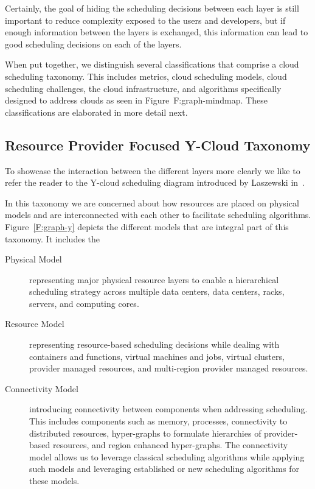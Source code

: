 \documentclass[final,5p,times,twocolumn]{elsarticle}
\begin{document}
Certainly, the goal of hiding the scheduling decisions between each
layer is still important to reduce complexity exposed to the users and
developers, but if enough information between the layers is exchanged,
this information can lead to good scheduling decisions on each of the
layers.

When put together, we distinguish several classifications that
comprise a cloud scheduling taxonomy. This includes
metrics, cloud scheduling models, cloud scheduling challenges, the
cloud infrastructure, and algorithms specifically designed to address
clouds as seen in Figure~{F:graph-mindmap}.  These classifications are
elaborated in more detail next.



\subsection{Resource Provider Focused Y-Cloud Taxonomy}\label{sec:y}

To showcase the interaction between the different layers more clearly
we like to refer the reader to the Y-cloud scheduling diagram
introduced by Laszewski in~\cite{lasbook}.

In this taxonomy we are concerned about how resources are placed on
physical models and are interconnected with each other to facilitate
scheduling algorithms. Figure~\ref{F:graph-y} depicts the different
models that are integral part of this taxonomy. It includes the 

\begin{description}

\item[Physical Model] representing major physical resource layers to
  enable a hierarchical scheduling strategy across multiple data
  centers, data centers, racks, servers, and computing cores.

\item[Resource Model] representing resource-based scheduling
  decisions while dealing with  containers and functions, virtual
  machines and jobs, virtual clusters, provider managed resources, and
  multi-region provider managed resources.

\item[Connectivity Model] introducing connectivity between components
  when addressing scheduling. This includes components such as memory,
  processes, connectivity to distributed resources, hyper-graphs to
  formulate hierarchies of provider-based resources, and region
  enhanced hyper-graphs. The connectivity model allows us to leverage
  classical scheduling algorithms while applying such models and
  leveraging established or new scheduling algorithms for these
  models.

\end{description}
\end{document}
